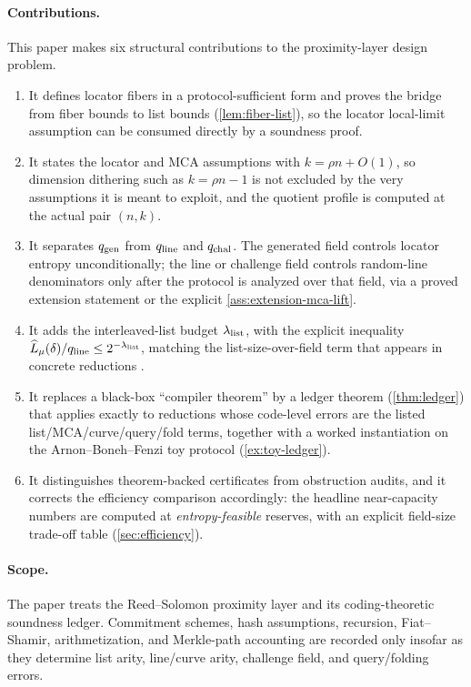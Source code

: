 \documentclass[11pt]{article}
\theoremstyle{definition}
\newcommand{\qgen}{q_{\rm gen}}
\newcommand{\qchal}{q_{\rm chal}}
\newcommand{\qline}{q_{\rm line}}
\begin{document}
\paragraph{Contributions.}
This paper makes six structural contributions to the proximity-layer design problem.
\begin{enumerate}[label=(\arabic*),leftmargin=2.2em]
\item It defines locator fibers in a protocol-sufficient form and proves the bridge from fiber bounds to list bounds (\cref{lem:fiber-list}), so the locator local-limit assumption can be consumed directly by a soundness proof.
\item It states the locator and MCA assumptions with $k=\rho n+O(1)$, so dimension dithering such as $k=\rho n-1$ is not excluded by the very assumptions it is meant to exploit, and the quotient profile is computed at the actual pair $(n,k)$.
\item It separates $\qgen$ from $\qline$ and $\qchal$.  The generated field controls locator entropy unconditionally; the line or challenge field controls random-line denominators only after the protocol is analyzed over that field, via a proved extension statement or the explicit \cref{ass:extension-mca-lift}.
\item It adds the interleaved-list budget $\lambda_{\rm list}$, with the explicit inequality $\widehat L_{\mu}(\delta)/\qline\le2^{-\lambda_{\rm list}}$, matching the list-size-over-field term that appears in concrete reductions \cite{ABF26}.
\item It replaces a black-box ``compiler theorem'' by a ledger theorem (\cref{thm:ledger}) that applies exactly to reductions whose code-level errors are the listed list/MCA/curve/query/fold terms, together with a worked instantiation on the Arnon--Boneh--Fenzi toy protocol (\cref{ex:toy-ledger}).
\item It distinguishes theorem-backed certificates from obstruction audits, and it corrects the efficiency comparison accordingly: the headline near-capacity numbers are computed at \emph{entropy-feasible} reserves, with an explicit field-size trade-off table (\cref{sec:efficiency}).
\end{enumerate}

\paragraph{Scope.}
The paper treats the Reed--Solomon proximity layer and its coding-theoretic soundness ledger.  Commitment schemes, hash assumptions, recursion, Fiat--Shamir, arithmetization, and Merkle-path accounting are recorded only insofar as they determine list arity, line/curve arity, challenge field, and query/folding errors.
\end{document}
